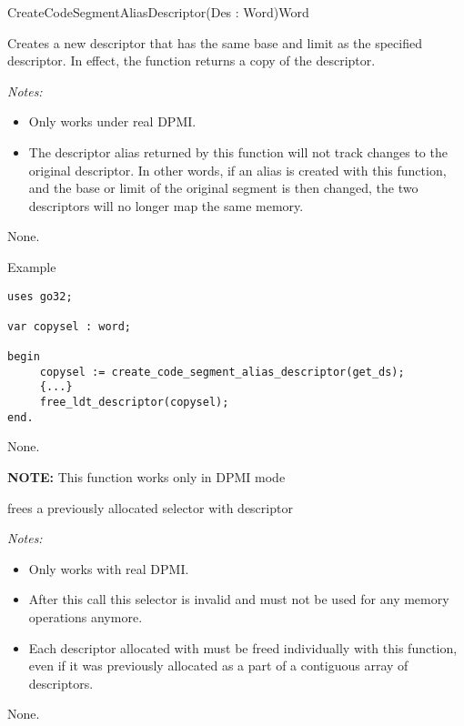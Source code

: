 {CreateCodeSegmentAliasDescriptor}{(Des : Word)}{Word}
{
Creates a new descriptor that has the same base and limit as the
specified descriptor.  In effect, the function returns a copy of the
descriptor.

{\em Notes:}
\begin{itemize}
\item Only works under real DPMI.
\item The descriptor alias returned by this function will not track changes
to the original descriptor. In other words, if an alias is created with
this function, and the base or limit of the original segment is then
changed, the two descriptors will no longer map the same memory.
\end{itemize}
}
{None.}
{}
\begin{FPCList}
\item[Example]
\begin{verbatim}
uses go32;

var copysel : word;

begin
     copysel := create_code_segment_alias_descriptor(get_ds);
     {...}
     free_ldt_descriptor(copysel);
end.
\end{verbatim}
\end{FPCList}


{None.}{}
\par {\bf NOTE: }This
function works only in DPMI mode\par 


{
 frees a previously allocated selector
with descriptor 

{\em Notes:}
\begin{itemize}
\item Only works with real DPMI.
\item After this call this selector is invalid and must not be used for any
memory operations anymore.
\item Each descriptor allocated with  must be 
freed
individually with this function, even if it was previously allocated as
a part of a contiguous array of descriptors.
\end{itemize}
}
{None.}
{}

